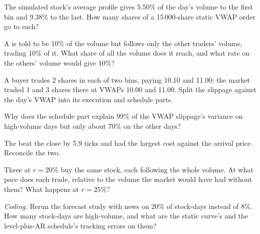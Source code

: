 \begin{exercise}[$\star$]\label{exo:mx:benchmark-algorithms:1}
The simulated stock's average profile gives 5.50\% of the day's volume to the first bin and 9.38\% to the last. How many shares of a 15\,000-share
static VWAP order go to each?
\end{exercise}

\begin{exercise}[$\star$]\label{exo:mx:benchmark-algorithms:2}
A  is told to be 10\% of the volume but follows only the other traders' volume, trading 10\% of it. What share of all the
volume does it reach, and what rate on the others' volume would give 10\%?
\end{exercise}

\begin{exercise}[$\star$]\label{exo:mx:benchmark-algorithms:3}
A buyer trades 2 shares in each of two bins, paying 10.10 and 11.00; the market traded 1 and 3 shares there at VWAPs 10.00 and 11.00. Split the
slippage against the day's VWAP into its execution and schedule parts.
\end{exercise}

\begin{exercise}[$\star\star$]\label{exo:mx:benchmark-algorithms:4}
Why does the schedule part explain 99\% of the VWAP slippage's variance on high-volume days but only about 70\% on the other days?
\end{exercise}

\begin{exercise}[$\star\star$]\label{exo:mx:benchmark-algorithms:5}
The  beat the close by 5.9 ticks and had the largest cost against the arrival price. Reconcile the two.
\end{exercise}

\begin{exercise}[$\star\star$]\label{exo:mx:benchmark-algorithms:6}
Three  at $r=20\%$ buy the same stock, each following the whole volume. At what pace does each trade, relative to the volume
the market would have had without them? What happens at $r=25\%$?
\end{exercise}

\begin{exercise}[$\star\star\star$]\label{exo:mx:benchmark-algorithms:7}
\emph{Coding.} Rerun the forecast study with news on 20\% of stock-days instead of 8\%. How many stock-days are high-volume, and what are the
static curve's and the level-plus-AR schedule's tracking errors on them?
\end{exercise}

